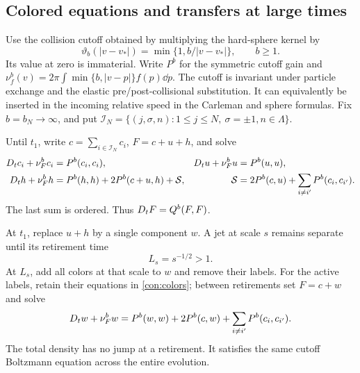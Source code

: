 \subsection{Colored equations and transfers at large times}

Use the collision cutoff obtained by multiplying the hard-sphere
kernel by
\[
 \vartheta_b(|v-v_*|)=\min\{1,b/|v-v_*|\},\qquad b\ge1.
\]
Its value at zero is immaterial.  Write \(P^b\) for the symmetric
cutoff gain and
\(\nu_f^b(v)=2\pi\int\min\{b,|v-p|\}f(p)\dd p\).
The cutoff is invariant under particle exchange and the elastic
pre/post-collisional substitution.  It can equivalently be inserted
in the incoming relative speed in the Carleman and sphere formulas.
Fix \(b=b_N\to\infty\), and put
\(\mathcal I_N=\{(j,\sigma,n):1\le j\le N,\ \sigma=\pm1,
 n\in\Lambda\}\).

Until \(t_1\), write \(c=\sum_{i\in\mathcal I_N}c_i\),
\(F=c+u+h\), and solve
\begin{equation}
 \begin{aligned}
 D_t c_i+\nu_F^b c_i&=P^b(c_i,c_i),&
 D_t u+\nu_F^b u&=P^b(u,u),\\
 D_t h+\nu_F^b h&=P^b(h,h)+2P^b(c+u,h)+\mathcal S,&
 \mathcal S&=2P^b(c,u)+\sum_{i\ne i'}P^b(c_i,c_{i'}).
 \end{aligned}
 \label{con:colors}
\end{equation}
The last sum is ordered.  Thus \(D_t F=Q^b(F,F)\).

At \(t_1\), replace \(u+h\) by a single component \(w\).  A jet at
scale \(s\) remains separate until its retirement time
\begin{equation}
 L_s=s^{-1/2}>1.
 \label{con:deadline}
\end{equation}
At \(L_s\), add all colors at that scale to \(w\) and remove their
labels.  For the active labels, retain their equations in
\eqref{con:colors}; between retirements set \(F=c+w\) and solve
\begin{equation}
 D_t w+\nu_F^b w
   =P^b(w,w)+2P^b(c,w)+\sum_{i\ne i'}P^b(c_i,c_{i'}).
 \label{con:late-colors}
\end{equation}
The total density has no jump at a retirement.  It satisfies the same
cutoff Boltzmann equation across the entire evolution.

